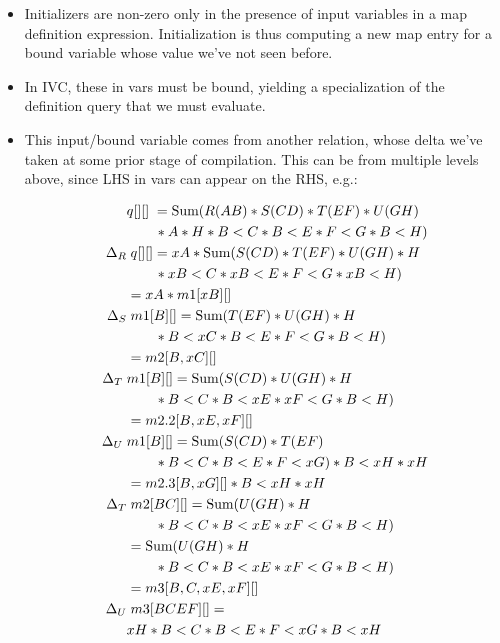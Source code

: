 \begin{itemize}
  \item Initializers are non-zero only in the presence of input variables in a
  map definition expression. Initialization is thus computing a new map entry
  for a bound variable whose value we've not seen before.

  \item In IVC, these in vars must be bound, yielding a specialization of the
  definition query that we must evaluate.
    
  \item This input/bound variable comes from another relation, whose delta
  we've taken at some prior stage of compilation. This can be from multiple
  levels above, since LHS in vars can appear on the RHS, e.g.:
  
  \begin{align*}
  & q[][] \; =
  \mbox{Sum}(R(AB)*S(CD)*T(EF)*U(GH) \\
  & \qquad * A * H * B<C * B<E * F<G  * B<H) \\
  \Delta_{R} & \; q[][] = xA*\mbox{Sum}(S(CD)*T(EF)*U(GH)*H \\
  & \qquad * xB<C * xB<E * F<G * xB<H)\\
  & = xA * m1[xB][]\\
  \Delta_{S} & \; m1[B][] = \mbox{Sum}(T(EF)*U(GH)*H \\
  & \qquad * B<xC * B<E * F<G * B<H)\\
  & = m2[B,xC][]\\
  \Delta_{T} \; & m1[B][] = \mbox{Sum}(S(CD)*U(GH)*H\\
  & \qquad * B<C * B<xE * xF<G * B<H)\\
  & = m2.2[B,xE,xF][]\\
  \Delta_{U} \; & m1[B][] = \mbox{Sum}(S(CD)*T(EF)\\
  & \qquad * B<C * B<E * F<xG) * B<xH * xH \\
  & = m2.3[B,xG][] * B<xH * xH \\
  \Delta_{T} & \; m2[BC][] = \mbox{Sum}(U(GH)*H \\
  & \qquad * B<C * B<xE * xF<G * B<H) \\
  & = \mbox{Sum}(U(GH)*H \\
  & \qquad * B<C * B<xE * xF<G * B<H)\\
  & = m3[B,C,xE,xF][]\\
  \Delta_{U} & \; m3[BCEF][] = \\
  & xH * B<C * B<E * F<xG * B<xH
  \end{align*}


\end{itemize}
